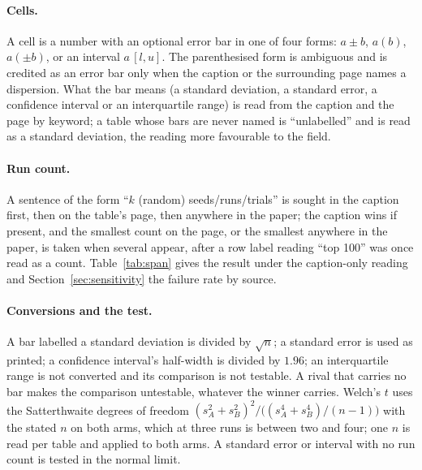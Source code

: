 \documentclass{article}
\begin{document}
\paragraph{Cells.} A cell is a number with an optional error bar in one of four
forms: $a \pm b$, $a(b)$, $a(\pm b)$, or an interval $a\,[l, u]$. The
parenthesised form is ambiguous and is credited as an error bar only when the
caption or the surrounding page names a dispersion. What the bar means (a
standard deviation, a standard error, a confidence interval or an interquartile
range) is read from the caption and the page by keyword; a table whose bars are never named is
``unlabelled'' and is read as a standard deviation, the reading more favourable
to the field.

\paragraph{Run count.} A sentence of the form ``$k$ (random) seeds/runs/trials''
is sought in the caption first, then on the table's page, then anywhere in the
paper; the caption wins if present, and the smallest count on the page, or
the smallest anywhere in the paper, is taken when several appear, after a row
label reading ``top 100'' was once read as a count. Table~\ref{tab:span}
gives the result under the caption-only reading and
Section~\ref{sec:sensitivity} the failure rate by source.

\paragraph{Conversions and the test.} A bar labelled a standard deviation is
divided by $\sqrt{n}$; a standard error is used as printed; a confidence
interval's half-width is divided by $1.96$; an interquartile range is not
converted and its comparison is not testable. A rival that carries no bar
makes the comparison untestable, whatever the winner carries. Welch's $t$
uses the Satterthwaite degrees of freedom
$(s_A^2 + s_B^2)^2 / \big((s_A^4 + s_B^4)/(n-1)\big)$ with the stated $n$ on
both arms, which at three runs is between two and four; one $n$ is read per
table and applied to both arms. A standard error or interval with no run
count is tested in the normal limit.
\end{document}
